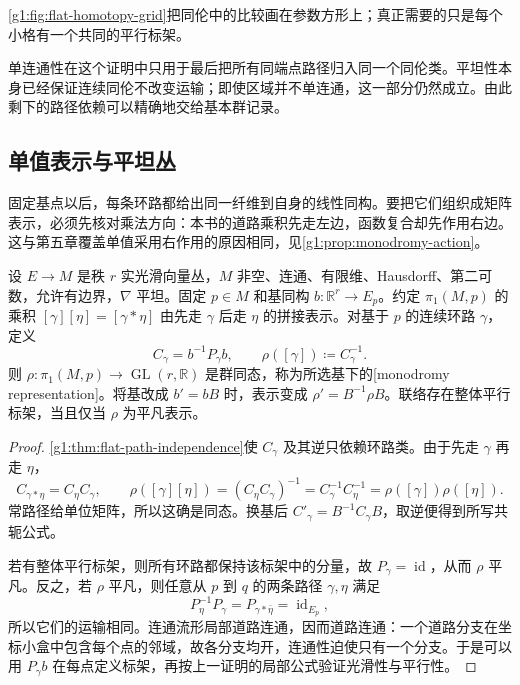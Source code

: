 \cref{g1:fig:flat-homotopy-grid}把同伦中的比较画在参数方形上；真正需要的只是每个小格有一个共同的平行标架。



单连通性在这个证明中只用于最后把所有同端点路径归入同一个同伦类。平坦性本身已经保证连续同伦不改变运输；即使区域并不单连通，这一部分仍然成立。由此剩下的路径依赖可以精确地交给基本群记录。

\subsection{单值表示与平坦丛}
\label{g1:subsec:1505:03}

固定基点以后，每条环路都给出同一纤维到自身的线性同构。要把它们组织成矩阵表示，必须先核对乘法方向：本书的道路乘积先走左边，函数复合却先作用右边。这与第五章覆盖单值采用右作用的原因相同，见\cref{g1:prop:monodromy-action}。

\begin{proposition}
	\label{g1:prop:flat-monodromy}
	设 \(E\to M\) 是秩 \(r\) 实光滑向量丛，\(M\) 非空、连通、有限维、Hausdorff、第二可数，允许有边界，\(\nabla\) 平坦。固定 \(p\in M\) 和基同构 \(b:\mathbb R^r\to E_p\)。约定 \(\pi_1(M,p)\) 的乘积 \([\gamma][\eta]=[\gamma*\eta]\) 由先走 \(\gamma\) 后走 \(\eta\) 的拼接表示。对基于 \(p\) 的连续环路 \(\gamma\)，定义
	\[
		C_\gamma=b^{-1}P_\gamma b,\qquad
		\rho([\gamma])\coloneqq C_\gamma^{-1}.
	\]
	则 \(\rho:\pi_1(M,p)\to\operatorname{GL}(r,\mathbb R)\) 是群同态，称为所选基下的[monodromy representation]。将基改成 \(b'=bB\) 时，表示变成 \(\rho'=B^{-1}\rho B\)。联络存在整体平行标架，当且仅当 \(\rho\) 为平凡表示。
\end{proposition}
\begin{proof}
	\cref{g1:thm:flat-path-independence}使 \(C_\gamma\) 及其逆只依赖环路类。由于先走 \(\gamma\) 再走 \(\eta\)，
	\[
		C_{\gamma*\eta}=C_\eta C_\gamma,\qquad
		\rho([\gamma][\eta])
		=(C_\eta C_\gamma)^{-1}
		=C_\gamma^{-1}C_\eta^{-1}
		=\rho([\gamma])\rho([\eta]).
	\]
	常路径给单位矩阵，所以这确是同态。换基后 \(C'_\gamma=B^{-1}C_\gamma B\)，取逆便得到所写共轭公式。

	若有整体平行标架，则所有环路都保持该标架中的分量，故 \(P_\gamma=\operatorname{id}\)，从而 \(\rho\) 平凡。反之，若 \(\rho\) 平凡，则任意从 \(p\) 到 \(q\) 的两条路径 \(\gamma,\eta\) 满足
	\[
		P_\eta^{-1}P_\gamma=P_{\gamma*\bar\eta}=\operatorname{id}_{E_p},
	\]
	所以它们的运输相同。连通流形局部道路连通，因而道路连通：一个道路分支在坐标小盒中包含每个点的邻域，故各分支均开，连通性迫使只有一个分支。于是可以用 \(P_\gamma b\) 在每点定义标架，再按上一证明的局部公式验证光滑性与平行性。
\end{proof}

